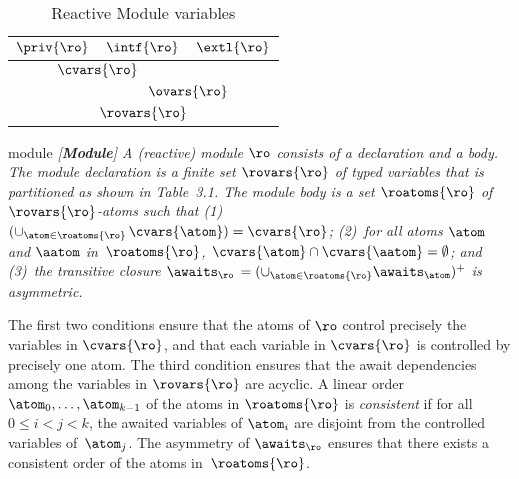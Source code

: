 \begin{table}
\begin{center}
\begin{tabular}{|c|c|c|}
  \hline
  $\priv{\ro}$ &$\intf{\ro}$&$\extl{\ro}$\\
  \hline
  \multicolumn{2}{|c|}{$\cvars{\ro}$} & \\
  \hline
  &\multicolumn{2}{c|}{$\ovars{\ro}$}\\
  \hline
  \multicolumn{3}{|c|}{$\rovars{\ro}$}\\
  \hline
\end{tabular}
\end{center}
\caption{Reactive Module variables}
\end{table}

\begin{defi}{module}\it
  {\em [{\bf Module}]}
  A {\em (reactive) module\/} $\ro$ consists of a declaration and a body.
  The module declaration is a finite set $\rovars{\ro}$ of typed variables
  that is partitioned as shown in Table~3.1.
  The module body is a set $\roatoms{\ro}$ of $\rovars{\ro}$-atoms such that
  (1)~$(\cup_{\atom\in\roatoms{\ro}}\,\cvars{\atom})=\cvars{\ro}$;
  (2)~for all atoms $\atom$ and $\aatom$ in~$\roatoms{\ro}$,
    $\cvars{\atom}\cap\cvars{\aatom}=\emptyset$;
    and
  (3)~the transitive closure
    $\awaits_\ro\,=(\cup_{\atom\in\roatoms{\ro}}\awaits_\atom)^+$ is
    asymmetric.
\end{defi}

\mypar The first two conditions ensure that the atoms of $\ro$
control precisely the variables in $\cvars{\ro}$, and that each
variable in $\cvars{\ro}$ is controlled by precisely one atom. The
third condition ensures that the await dependencies among the
variables in $\rovars{\ro}$ are acyclic. A linear order
$\atom_0,\ldots,\atom_{k-1}$ of the atoms in $\roatoms{\ro}$ is
{\em consistent\/} if for all $0\le i<j<k$, the awaited variables
of $\atom_i$ are disjoint from the controlled variables
of~$\atom_j$. The asymmetry of $\awaits_\ro$ ensures that there
exists a consistent order of the atoms in~$\roatoms{\ro}$.

